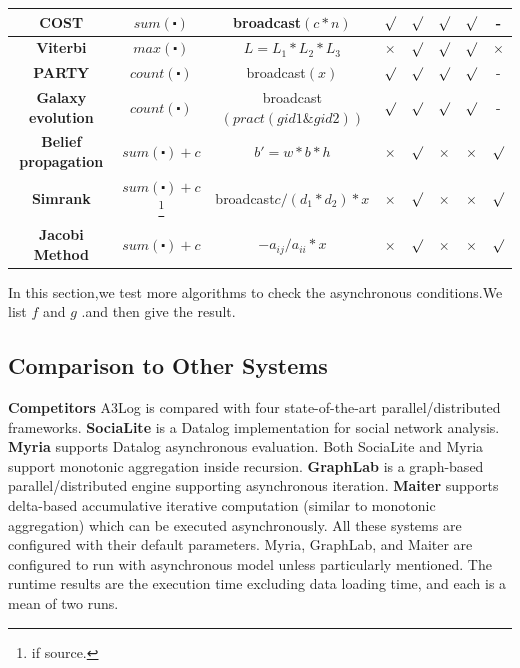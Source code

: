 \begin{table}[!t]
\begin{tabular}{c|c|c|c|c|c|c|c}
		\hline
		\textbf{COST} & $sum(\centerdot)$&broadcast$(c*n)$ & $\surd$ & $\surd$ & $\surd$ & $\surd$ & -\\
		\hline
		\textbf{Viterbi} & $max(\centerdot)$ & $L=L_1*L_2*L_3$ & $\times$ & $\surd$ &  $\surd$ &  $\surd$&$\times$\\
		\hline
		\textbf{PARTY} & $count(\centerdot)$&broadcast$(x)$ & $\surd$ & $\surd$ & $\surd$ & $\surd$ & -\\
		\hline
		\textbf{Galaxy evolution} & $count(\centerdot)$ &broadcast$(pract(gid1\& gid2))$ & $\surd$ & $\surd$ & $\surd$ & $\surd$ & -\\
		\hline
		\textbf{Belief propagation} & $sum(\centerdot)+c$ &$b'=w*b*h$ & $\times$ & $\surd$ & $\times$ & $\times$& $\surd$\\
		\hline
		\textbf{Simrank} & $sum(\centerdot)+c$\footnote{if source.}& broadcast$c/(d_1*d_2)*x$ & $\times$ &  $\surd$ &  $\times$ &  $\times$& $\surd$\\
		\hline
		\textbf{Jacobi Method} &$sum(\centerdot)+c$ &$-a_{ij}/a_{ii}*x$& $\times$ & $\surd$  & $\times$ & $\times$ & $\surd$\\
		\hline
		\hline
	\end{tabular}
	\vspace{-0.1in}
\end{table}

In this section,we test more algorithms to check the asynchronous conditions.We list $f$ and $g$ .and then give the result.



\subsection{Comparison to Other Systems}
\label{sec:expr:othersystems}

\noindent\textbf{Competitors}
A3Log is compared with four state-of-the-art parallel/distributed frameworks. \textbf{SociaLite} \cite{Lam:2013:SDE:2510649.2511289,Seo:2013:DSD:2556549.2556572} is a Datalog implementation for social network analysis. \textbf{Myria} \cite{Halperin:2014:DMB:2588555.2594530,Wang:2015:AFR:2824032.2824052} supports Datalog asynchronous evaluation. Both SociaLite and Myria support monotonic aggregation inside recursion. \textbf{GraphLab} \cite{Low:2012:DGF:2212351.2212354} is a graph-based parallel/distributed engine supporting asynchronous iteration. \textbf{Maiter} \cite{maiter} supports delta-based accumulative iterative computation (similar to monotonic aggregation) which can be executed asynchronously. All these systems are configured with their default parameters. Myria, GraphLab, and Maiter are configured to run with asynchronous model unless particularly mentioned. The runtime results are the execution time excluding data loading time, and each is a mean of two runs.

